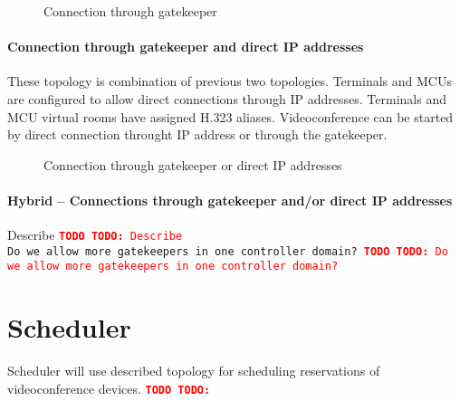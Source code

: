 \documentclass[a4paper]{report}
\newcommand{\TODO}[1]{%
\def\empty{}%
\def\prvniparametr{#1}%
\ifx\prvniparametr\empty%
\begingroup\tt\textcolor{red}{\noindent\textbf{TODO}}\endgroup
\else%
\begingroup\tt\textcolor{red}{\noindent\textbf{TODO:}\ #1}\endgroup
\fi%
}
\newcommand{\graph}[4]{
\begin{figure}[h!]
\centering\scalebox{\ifx&#4& 0.75 \else #4 \fi}{}
\label{#1}
\caption{#3}
\end{figure}
}
\begin{document}
\graph{graph:h323:gatekeeper}{graph/h323_gatekeeper.tex}{Connection through gatekeeper}{}


\subsubsection{Connection through gatekeeper and direct IP addresses}

These topology is combination of previous two topologies. Terminals and MCUs are configured to allow direct connections through IP addresses. Terminals and MCU virtual rooms have assigned H.323 aliases. Videoconference can be started by direct connection throught IP address or through the gatekeeper.

\graph{graph:h323:gatekeeper}{graph/h323_gatekeeper_or_direct.tex}{Connection through gatekeeper or direct IP addresses}{0.7}


\subsubsection{Hybrid -- Connections through gatekeeper and/or direct IP addresses}

\TODO{Describe} \\
\TODO{Do we allow more gatekeepers in one controller domain?}


\chapter{Scheduler}

Scheduler will use described topology for scheduling reservations of videoconference devices.
\TODO{}
\end{document}
